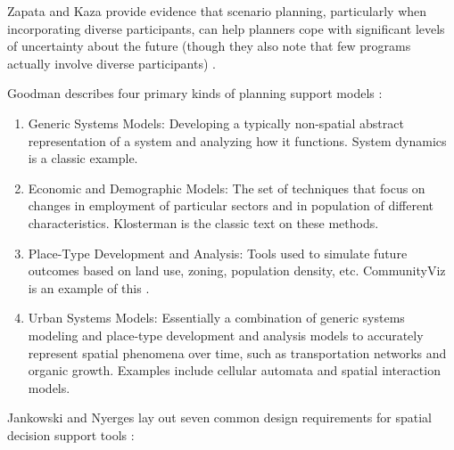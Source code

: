 Zapata and Kaza provide evidence that scenario planning, particularly when incorporating diverse participants, can help planners cope with significant levels of uncertainty about the future (though they also note that few programs actually involve diverse participants) \cite{zapataRadicalUncertaintyScenario2015}.

Goodman describes four primary kinds of planning support models \cite{goodspeedScenarioPlanningCities2020}: 

\begin{enumerate}[itemsep=0pt,parsep=0pt]
	\item{Generic Systems Models: Developing a typically non-spatial abstract representation of a system and analyzing how it functions. System dynamics is a classic example.}
	\item{Economic and Demographic Models: The set of techniques that focus on changes in employment of particular sectors and in population of different characteristics. Klosterman is the classic text on these methods. \cite{klostermanCommunityAnalysisPlanning1990}}
	\item{Place-Type Development and Analysis: Tools used to simulate future outcomes based on land use, zoning, population density, etc. CommunityViz is an example of this \cite{walkerPlannersGuideCommunityViz2017}.}
	\item{Urban Systems Models: Essentially a combination of generic systems modeling and place-type development and analysis models to accurately represent spatial phenomena over time, such as transportation networks and organic growth. Examples include cellular automata and spatial interaction models.}
\end{enumerate}


Jankowski and Nyerges lay out seven common design requirements for spatial decision support tools \cite{jankowskiGISGroupDecision2001}:

